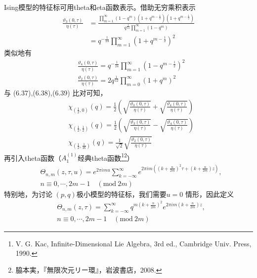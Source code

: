 Ising模型的特征标可用theta和eta函数表示。借助无穷乘积表示
\begin{equation}
	\begin{aligned} \frac{\vartheta_{3}(0, \tau)}{\eta(\tau)} &=\frac{\prod_{m=1}^{\infty}\left(1-q^{m}\right) (1+q^{m-\frac{1}{2}} ) (1+q^{m-\frac{1}{2}} )}{q^{\frac{1}{24}} \prod_{m=1}^{\infty}\left(1-q^{m}\right)} \\ &=q^{-\frac{1}{24}} \prod_{m=1}^{\infty} (1+q^{m-\frac{1}{2}} )^{2} \end{aligned} 
\end{equation}
类似地有
\begin{align} &\frac{\vartheta_{4}(0, \tau)}{\eta(\tau)}=q^{-\frac{1}{24}} \prod_{m=1}^{\infty} (1-q^{m-\frac{1}{2}} )^{2}\\ &\frac{\vartheta_{2}(0, \tau)}{\eta(\tau)}=2 q^{\frac{1}{12}} \prod_{m=0}^{\infty}\left(1+q^{m}\right)^{2}\end{align}
与 (6.37),(6.38),(6.39) 比对可知，
\begin{align} & \chi_{\left(\frac{1}{2}, 0\right)}(q)=\frac{1}{2}\left(\sqrt{\frac{\vartheta_{3}(0, \tau)}{\eta(\tau)}}+\sqrt{\frac{\vartheta_{4}(0, \tau)}{\eta(\tau)}}\right) \\ &\chi_{\left(\frac{1}{2}, \frac{1}{2}\right)}(q)=\frac{1}{2}\left(\sqrt{\frac{\vartheta_{3}(0, \tau)}{\eta(\tau)}}-\sqrt{\frac{\vartheta_{4}(0, \tau)}{\eta(\tau)}}\right) \\ &\chi_{\left(\frac{1}{2}, \frac{1}{16}\right)}(q)=\frac{1}{\sqrt{2}} \sqrt{\frac{\vartheta_{2}(0, \tau)}{\eta(\tau)}} \end{align}
再引入theta函数（$ A_1^{(1)} $经典theta函数\footnote{V. G. Kac, Infinite-Dimensional Lie Algebra, 3rd ed., Cambridge Univ. Press, 1990.}\footnote{脇本実，『無限次元リー環』，岩波書店，2008.}）
\begin{equation}
	\begin{aligned} &\Theta_{n, m}(z, \tau, u)=e^{2 \pi i m u} \sum_{k=-\infty}^{\infty} e^{2 \pi i m\left(\left(k+\frac{n}{2 m}\right)^{2} \tau+\left(k+\frac{n}{2 m}\right) z\right)}, \\ &n \equiv 0, \cdots, 2 m-1 \quad(\text{mod}\ 2 m) \end{aligned} 
\end{equation}
特别地，为讨论 $(p,q) $极小模型的特征标，我们需要$ u=0$ 情形，因此定义
\begin{equation}
	\begin{aligned} &\Theta_{n, m}(z, \tau)=\sum_{k=-\infty}^{\infty} q^{m\left(k+\frac{n}{2 m}\right)^{2}} e^{2 \pi i m\left(k+\frac{n}{2 m}\right) z} ,\\ &n \equiv 0, \cdots, 2 m-1 \quad(\text{mod}\ 2 m) \end{aligned}
\end{equation}

